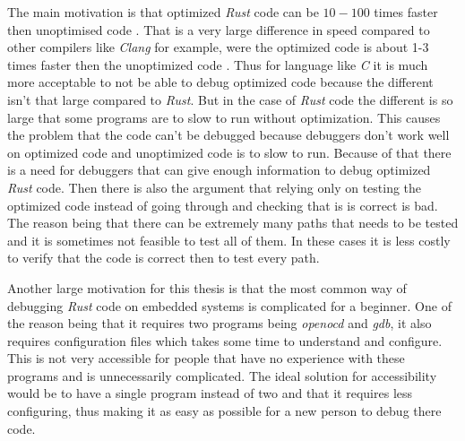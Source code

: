 


The main motivation is that optimized \emph{Rust} code can be $10-100$ times faster then unoptimised code \cite{perf-book}.
That is a very large difference in speed compared to other compilers like \emph{Clang} for example, were the optimized code is about 1-3 times faster then the unoptimized code \cite{clang-opt}.
Thus for language like \emph{C} it is much more acceptable to not be able to debug optimized code because the different isn't that large compared to \emph{Rust}.
But in the case of \emph{Rust} code the different is so large that some programs are to slow to run without optimization.
This causes the problem that the code can't be debugged because debuggers don't work well on optimized code and unoptimized code is to slow to run.
Because of that there is a need for debuggers that can give enough information to debug optimized \emph{Rust} code.
Then there is also the argument that relying only on testing the optimized code instead of going through and checking that is is correct is bad.
The reason being that there can be extremely many paths that needs to be tested and it is sometimes not feasible to test all of them.
In these cases it is less costly to verify that the code is correct then to test every path.


Another large motivation for this thesis is that the most common way of debugging \emph{Rust} code on embedded systems is complicated for a beginner.
One of the reason being that it requires two programs being \emph{openocd} and \emph{gdb}, it also requires configuration files which takes some time to understand and configure.
This is not very accessible for people that have no experience with these programs and is unnecessarily complicated.
The ideal solution for accessibility would be to have a single program instead of two and that it requires less configuring, thus making it as easy as possible for a new person to debug there code.


